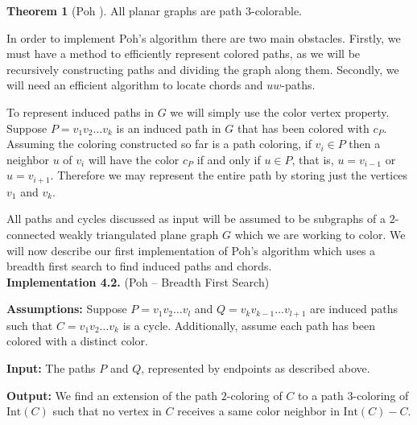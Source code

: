 \documentclass[letterpaper, 12pt]{amsart}
\theoremstyle{definition}
\theoremstyle{definition}
\theoremstyle{thm}
\newtheorem{theorem}{Theorem}[section]
\theoremstyle{definition}
\begin{document}
\begin{theorem}[Poh \cite{poh}]
All planar graphs are path $3$-colorable.
\end{theorem}

In order to implement Poh's algorithm there are two main obstacles. Firstly, we
must have a method to efficiently represent colored paths, as we
will be recursively constructing paths and dividing the graph along them.
Secondly, we will need an efficient algorithm to locate chords and $uw$-paths.

To represent induced paths in $G$ we will simply use the color
vertex property. Suppose $P=v_1v_2\ldots v_k$ is an induced path in $G$ that has
been colored with $c_P$. Assuming the coloring constructed so far
is a path coloring, if $v_i\in P$ then a neighbor $u$ of $v_i$ will
have the color $c_P$ if and only if $u\in P$, that is, $u=v_{i-1}$ or $u=v_{i+1}$.
Therefore we may represent the entire path by storing just the vertices $v_1$
and $v_k$. 

All paths and cycles discussed as input will be assumed to be subgraphs of a
$2$-connected weakly triangulated plane graph $G$ which we are working to color.
We will now describe our first implementation of Poh's algorithm which uses a
breadth first search to find induced paths and chords.\\

\noindent\textbf{Implementation 4.2.} (Poh -- Breadth First Search)

\noindent\textbf{Assumptions:} Suppose $P=v_1v_2\ldots v_l$ and
$Q=v_kv_{k-1}\ldots v_{l+1}$ are induced
paths such that $C=v_1v_2\ldots v_k$ is a cycle. Additionally, assume each
path has been colored with a distinct color.

\noindent\textbf{Input:} The paths $P$ and $Q$, represented by endpoints as
described above.

\noindent\textbf{Output:} We find an extension of the path $2$-coloring of $C$ to
a path $3$-coloring of $\text{Int}(C)$ such that
no vertex in $C$ receives a same color neighbor in $\text{Int}(C)-C$.
\end{document}
